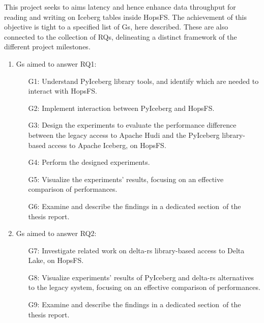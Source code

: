 This project seeks to aims latency and hence enhance data throughput for reading and writing on Iceberg tables inside \gls{HopsFS}. The achievement of this objective is tight to a specified list of \glspl{G}, here described. These are also connected to the collection of \glspl{RQ}, delineating a distinct framework of the different project milestones.

\begin{enumerate}
    \item \glspl{G} aimed to answer RQ1: 
        \begin{enumerate}
            \item[G1:] Understand PyIceberg library tools, and identify which are needed to interact with \gls{HopsFS}.
            \item[G2:] Implement interaction between PyIceberg and \gls{HopsFS}. 
            \item[G3:] Design the experiments to evaluate the performance difference between the legacy access to Apache Hudi and the PyIceberg library-based access to Apache Iceberg, on \gls{HopsFS}. 
            \item[G4:] Perform the designed experiments.
            \item[G5:] Visualize the experiments' results, focusing on an effective comparison of performances.
            \item[G6:] Examine and describe the findings in a dedicated section of the thesis report.
        \end{enumerate}
    \item \glspl{G} aimed to answer RQ2:
        \begin{enumerate}
            \item[G7:] Investigate related work on delta-rs library-based access to Delta Lake, on \gls{HopsFS}.
            \item[G8:] Visualize experiments' results of PyIceberg and delta-rs alternatives to the legacy system, focusing on an effective comparison of performances.
            \item[G9:] Examine and describe the findings in a dedicated section of the thesis report.
        \end{enumerate}
\end{enumerate}

